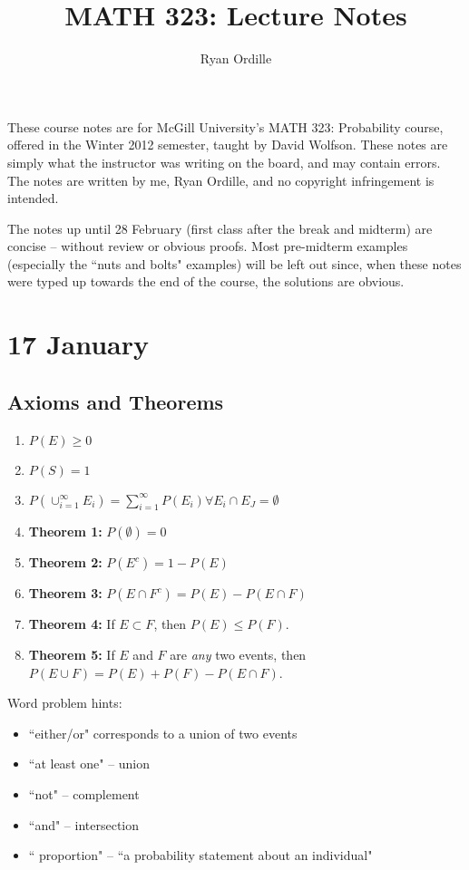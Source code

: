 \documentclass[12pt]{article}
\title{MATH 323: Lecture Notes}
\author{Ryan Ordille}
\begin{document}
\maketitle
\date{}

\pagestyle{myheadings}
These course notes are for McGill University's MATH 323: Probability course, offered in the Winter 2012 semester, taught by David Wolfson. These notes are simply what the instructor was writing on the board, and may contain errors. The notes are written by me, Ryan Ordille, and no copyright infringement is intended. 

The notes up until 28 February (first class after the break and midterm) are concise -- without review or obvious proofs. Most pre-midterm examples (especially the ``nuts and bolts" examples) will be left out since, when these notes were typed up towards the end of the course, the solutions are obvious.



\section{17 January}
\subsection{Axioms and Theorems}
\begin{enumerate}
    \item $P(E) \geq 0$
    \item $P(S) = 1$
    \item $P(\cup_{i=1}^{\infty} E_i) = \sum_{i=1}^{\infty} P(E_i) \forall E_i \cap E_J = \emptyset$
    \item \textbf{Theorem 1:} $P(\emptyset) = 0$
    \item \textbf{Theorem 2:} $P(E^c) = 1 - P(E)$
    \item \textbf{Theorem 3:} $P(E \cap F^c) = P(E) - P(E \cap F)$
    \item \textbf{Theorem 4:} If $E \subset F$, then $P(E) \leq P(F)$.
    \item \textbf{Theorem 5:} If $E$ and $F$ are \emph{any} two events, then $P(E \cup F) = P(E) + P(F) - P(E \cap F)$.
\end{enumerate}

Word problem hints:
\begin{itemize}
    \item ``either/or" corresponds to a union of two events
    \item ``at least one" -- union
    \item ``not" -- complement
    \item ``and" -- intersection
    \item `` proportion" -- ``a probability statement about an individual"
\end{itemize}
\end{document}
